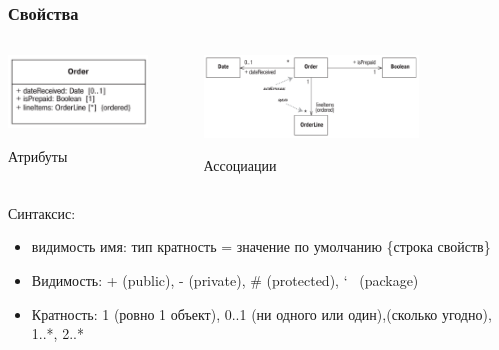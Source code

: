 \documentclass{../../slides-style}
\begin{document}
    \begin{frame}
        \frametitle{Свойства}
        \begin{columns}
            \begin{column}{0.3\textwidth}
                \begin{center}
                    \includegraphics[width=0.8\textwidth]{attributes.png}

                    Атрибуты
                \end{center}
            \end{column}
            \begin{column}{0.7\textwidth}
                \begin{center}
                    \includegraphics[width=0.7\textwidth]{associations.png}

                    Ассоциации
                \end{center}
            \end{column}
        \end{columns}
        \bigskip
        Синтаксис:
        \begin{itemize}
            \item видимость имя: тип кратность = значение по умолчанию \{строка свойств\}
            \item Видимость: + (public), - (private), \# (protected), \char`~ (package)
            \item Кратность: 1 (ровно 1 объект), 0..1 (ни одного или один),\newline * (сколько угодно), 1..*, 2..*
        \end{itemize}
    \end{frame}
\end{document}
